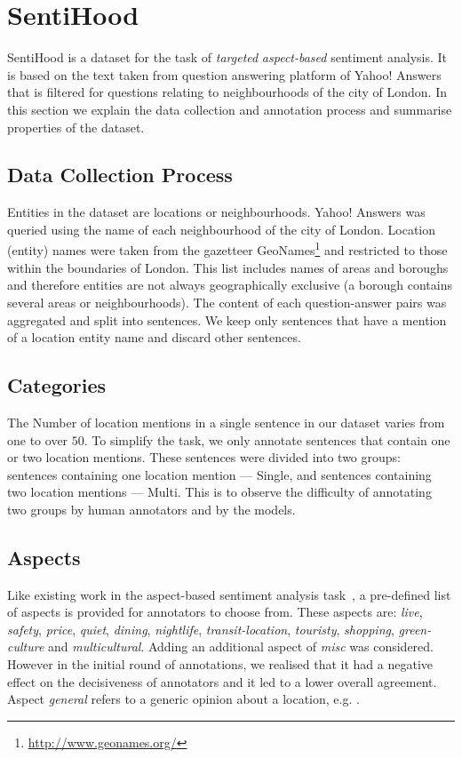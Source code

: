 \documentclass[11pt]{article}
\begin{document}
\section{SentiHood}
    SentiHood is a dataset for the task of \emph{targeted} \emph{aspect-based} sentiment analysis. It is based on the text taken from question answering platform of Yahoo! Answers that is filtered for questions relating to neighbourhoods of the city of London. In this section we explain the data collection and annotation process and summarise properties of the dataset.
    \subsection{Data Collection Process}
        Entities in the dataset are locations or neighbourhoods. Yahoo! Answers was queried using the name of each neighbourhood of the city of London. Location (entity) names were taken from the gazetteer GeoNames\footnote{\url{http://www.geonames.org/}} and restricted to those within the boundaries of London. This list includes names of areas and boroughs and therefore entities are not always geographically exclusive (a borough contains several areas or neighbourhoods). The content of each question-answer pairs was aggregated and split into sentences. We keep only sentences that have a mention of a location entity name and discard other sentences.
 
    \subsection{Categories}
    The Number of location mentions in a single sentence in our dataset varies from one to over $50$. To simplify the task, we only annotate sentences that contain one or two location mentions. These sentences were divided into two groups: sentences containing one location mention --- Single, and sentences containing two location mentions --- Multi. This is to observe the difficulty of annotating two groups by human annotators and by the models.
    
    \subsection{Aspects} 
    Like existing work in the aspect-based sentiment analysis task~\cite{brychcin2014uwb}, a pre-defined list of aspects is provided for annotators to choose from. These aspects are: \textit{live}, \textit{safety}, \textit{price}, \textit{quiet}, \textit{dining}, \textit{nightlife}, \textit{transit-location}, \textit{touristy}, \textit{shopping}, \textit{green-culture} and \textit{multicultural}. Adding an additional aspect of \textit{misc} was considered. However in the initial round of annotations, we realised that it had a negative effect on the decisiveness of annotators and it led to a lower overall agreement. Aspect \textit{general} refers to a generic opinion about a location, e.g. .  
    
\end{document}
